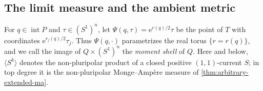 \subsection{The limit measure and the ambient metric}

For $q\in\operatorname{int}P$ and $\tau\in(S^1)^n$, let $\Psi(q,\tau)=\mathrm e^{r(q)/2}\tau$ be the point of $T$ with coordinates $\mathrm e^{r_j(q)/2}\tau_j$. Thus $\Psi(q,\cdot)$ parametrizes the real torus $\{r=r(q)\}$, and we call the image of $Q\times(S^1)^n$ the \emph{moment shell} of $Q$. Here and below, $\langle S^k\rangle$ denotes the non-pluripolar product of a closed positive $(1,1)$-current $S$; in top degree it is the non-pluripolar Monge--Amp\`ere measure of \cref{thm:arbitrary-extended-ma}.

